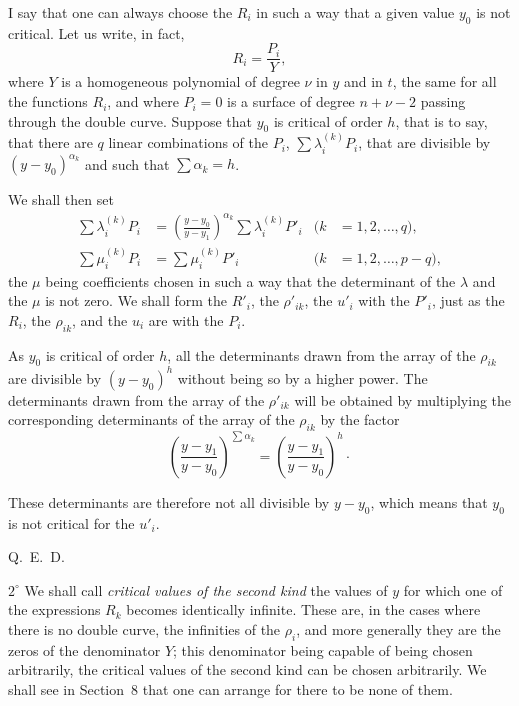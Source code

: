 \documentclass{article}
\begin{document}
I say that one can always choose the $R_{i}$ in such a way that a given value $y_{0}$ is not critical. Let us write, in fact,
\[
R_{i} = \frac{P_{i}}{Y},
\]
where $Y$ is a homogeneous polynomial of degree $\nu$ in $y$ and in $t$, the same for all the functions $R_{i}$, and where $P_{i} = 0$ is a surface of degree $n + \nu - 2$ passing through the double curve. Suppose that $y_{0}$ is critical of order $h$, that is to say, that there are $q$ linear combinations of the $P_{i}$, $\displaystyle\sum \lambda_{i}^{(k)} P_{i}$, that are divisible by $(y - y_{0})^{\alpha_{k}}$ and such that $\displaystyle\sum \alpha_{k} = h$.

We shall then set
\[
\begin{aligned}
\sum \lambda_{i}^{(k)} P_{i} &= \left(\frac{y - y_{0}}{y - y_{1}}\right)^{\alpha_{k}} \sum \lambda_{i}^{(k)} P'_{i} & (k &= 1, 2, \ldots, q), \\
\sum \mu_{i}^{(k)} P_{i} &= \sum \mu_{i}^{(k)} P'_{i} & (k &= 1, 2, \ldots, p - q),
\end{aligned}
\]
the $\mu$ being coefficients chosen in such a way that the determinant of the $\lambda$ and the $\mu$ is not zero. We shall form the $R'_{i}$, the $\rho'_{ik}$, the $u'_{i}$ with the $P'_{i}$, just as the $R_{i}$, the $\rho_{ik}$, and the $u_{i}$ are with the $P_{i}$.

As $y_{0}$ is critical of order $h$, all the determinants drawn from the array of the $\rho_{ik}$ are divisible by $(y - y_{0})^{h}$ without being so by a higher power. The determinants drawn from the array of the $\rho'_{ik}$ will be obtained
by multiplying the corresponding determinants of the array of the $\rho_{ik}$ by the factor
\[
\left(\frac{y - y_{1}}{y - y_{0}}\right)^{\sum \alpha_{k}} = \left(\frac{y - y_{1}}{y - y_{0}}\right)^{h} \cdot
\]

These determinants are therefore not all divisible by $y - y_{0}$, which means that $y_{0}$ is not critical for the $u'_{i}$.

\hfill Q.~E.~D.

$2^\circ$ We shall call \emph{critical values of the second kind} the values of $y$ for which one of the expressions $R_{k}$ becomes identically infinite. These are, in the cases where there is no double curve, the infinities of the $\rho_{i}$, and more generally they are the zeros of the denominator $Y$; this denominator being capable of being chosen arbitrarily, the critical values of the second kind can be chosen arbitrarily. We shall see in Section~8 that one can arrange for there to be none of them.
\end{document}
